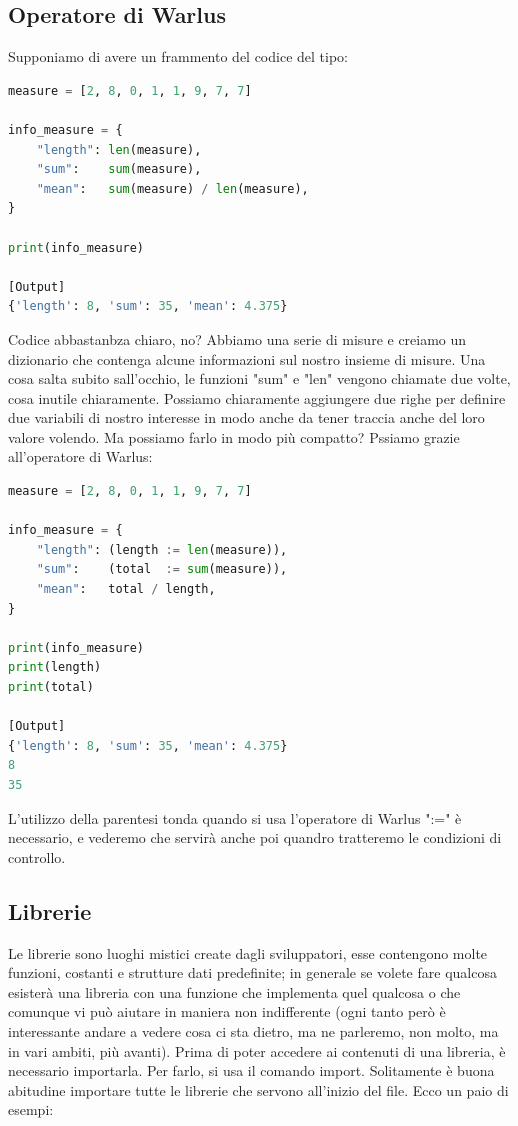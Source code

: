\documentclass[10pt,a4paper]{article}
\begin{document}
\subsection{Operatore di Warlus}
Supponiamo di avere un frammento del codice del tipo:
\begin{lstlisting}[language=Python]
measure = [2, 8, 0, 1, 1, 9, 7, 7]

info_measure = {
    "length": len(measure),
    "sum":    sum(measure),
    "mean":   sum(measure) / len(measure),
}

print(info_measure)

[Output]
{'length': 8, 'sum': 35, 'mean': 4.375}
\end{lstlisting}
Codice abbastanbza chiaro, no? Abbiamo una serie di misure e creiamo un dizionario che contenga alcune informazioni sul nostro insieme di misure. Una cosa salta subito sall'occhio, le funzioni "sum" e "len" vengono chiamate due volte, cosa inutile chiaramente. Possiamo chiaramente aggiungere due righe per definire due variabili di nostro interesse in modo anche da tener traccia anche del loro valore volendo. Ma possiamo farlo in modo più compatto? Pssiamo grazie all'operatore di Warlus:
\begin{lstlisting}[language=Python]
measure = [2, 8, 0, 1, 1, 9, 7, 7]

info_measure = {
    "length": (length := len(measure)),
    "sum":    (total  := sum(measure)),
    "mean":   total / length,
}

print(info_measure)
print(length)
print(total)

[Output]
{'length': 8, 'sum': 35, 'mean': 4.375}
8
35
\end{lstlisting}
L'utilizzo della parentesi tonda quando si usa l'operatore di Warlus ":=" è necessario, e vederemo che servirà anche poi quandro tratteremo le condizioni di controllo.

\subsection{Librerie}
Le librerie sono luoghi mistici create dagli sviluppatori, esse contengono molte funzioni, costanti e strutture dati predefinite; in generale se volete fare qualcosa esisterà una libreria con una funzione che implementa quel qualcosa o che comunque vi può aiutare in maniera non indifferente (ogni tanto però è interessante andare a vedere cosa ci sta dietro, ma ne parleremo, non molto, ma in vari ambiti, più avanti). Prima di poter accedere ai contenuti di una libreria, è necessario importarla. Per farlo, si usa il comando import. Solitamente è buona abitudine importare tutte le librerie che servono all'inizio del file. Ecco un paio di esempi:
\end{document}
